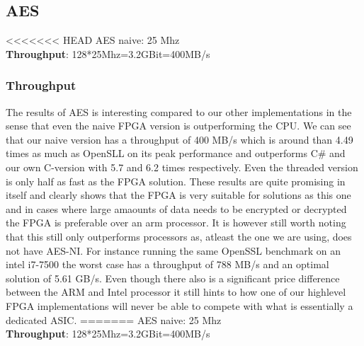 \documentclass[a4paper]{article}
\begin{document}
\begin{enumerate}
\subsection{AES}
<<<<<<< HEAD
\label{sec:org33209e4}
AES naive: 25 Mhz\\
\textbf{Throughput}: 128*25Mhz=3.2GBit=400MB/s
\subsubsection{Throughput}
\label{sec:orgaa688fc}
The results of AES is interesting compared to our other implementations in the sense that even the naive FPGA version is outperforming the CPU. We can see that our naive version has a throughput of 400 MB/s which is around than 4.49 times as much as OpenSLL on its peak performance and outperforms C\# and our own C-version with 5.7 and 6.2 times respectively. Even the threaded version is only half as fast as the FPGA solution. These results are quite promising in itself and clearly shows that the FPGA is very suitable for solutions as this one and in cases where large amaounts of data needs to be encrypted or decrypted the FPGA is preferable over an arm processor. It is however still worth noting that this still only outperforms processors as, atleast the one we are using, does not have AES-NI. For instance running the same OpenSSL benchmark on an intel i7-7500 the worst case has a throughput of 788 MB/s and an optimal solution of 5.61 GB/s. Even though there also is a significant price difference between the ARM and Intel processor it still hints to how one of our highlevel FPGA implementations will never be able to compete with what is essentially a dedicated ASIC.
=======
\label{sec:orga258acd}
AES naive: 25 Mhz\\
\textbf{Throughput}: 128*25Mhz=3.2GBit=400MB/s

\end{enumerate}
\end{document}
